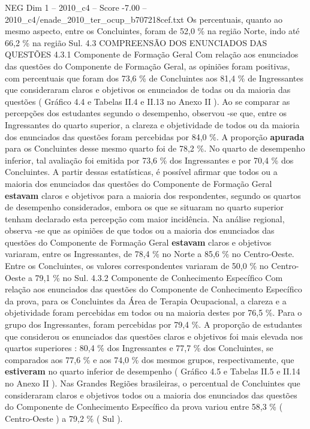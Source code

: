 \begin{textsample}{NEG Dim 1 – 2010\_c4 – Score -7.00 – 2010\_c4/enade\_2010\_ter\_ocup\_b707218cef.txt}
Os percentuais, quanto ao mesmo aspecto, entre os Concluintes, foram de 52,0 \% na região Norte, indo até 66,2 \% na região Sul. 4.3 COMPREENSÃO DOS ENUNCIADOS DAS QUESTÕES 4.3.1 Componente de Formação Geral Com relação aos enunciados das questões do Componente de Formação Geral, as opiniões foram positivas, com percentuais que foram dos 73,6 \% de Concluintes aos 81,4 \% de Ingressantes que consideraram claros e objetivos os enunciados de todas ou da maioria das questões ( Gráfico 4.4 e Tabelas II.4 e II.13 no Anexo II ).
Ao se comparar as percepções dos estudantes segundo o desempenho, observou -se que, entre os Ingressantes do quarto superior, a clareza e objetividade de todos ou da maioria dos enunciados das questões foram percebidas por 84,0 \%.
A proporção \textbf{apurada} para os Concluintes desse mesmo quarto foi de 78,2 \%.
No quarto de desempenho inferior, tal avaliação foi emitida por 73,6 \% dos Ingressantes e por 70,4 \% dos Concluintes.
A partir dessas estatísticas, é possível afirmar que todos ou a maioria dos enunciados das questões do Componente de Formação Geral \textbf{estavam} claros e objetivos para a maioria dos respondentes, segundo os quartos de desempenho considerados, embora os que se situaram no quarto superior tenham declarado esta percepção com maior incidência.
Na análise regional, observa -se que as opiniões de que todos ou a maioria dos enunciados das questões do Componente de Formação Geral \textbf{estavam} claros e objetivos variaram, entre os Ingressantes, de 78,4 \% no Norte a 85,6 \% no Centro-Oeste.
Entre os Concluintes, os valores correspondentes variaram de 50,0 \% no Centro-Oeste a 79,1 \% no Sul. 4.3.2 Componente de Conhecimento Específico Com relação aos enunciados das questões do Componente de Conhecimento Específico da prova, para os Concluintes da Área de Terapia Ocupacional, a clareza e a objetividade foram percebidas em todos ou na maioria destes por 76,5 \%.
Para o grupo dos Ingressantes, foram percebidas por 79,4 \%.
A proporção de estudantes que considerou os enunciados das questões claros e objetivos foi mais elevada nos quartos superiores : 80,4 \% dos Ingressantes e 77,7 \% dos Concluintes, se comparados aos 77,6 \% e aos 74,0 \% dos mesmos grupos, respectivamente, que \textbf{estiveram} no quarto inferior de desempenho ( Gráfico 4.5 e Tabelas II.5 e II.14 no Anexo II ).
Nas Grandes Regiões brasileiras, o percentual de Concluintes que consideraram claros e objetivos todos ou a maioria dos enunciados das questões do Componente de Conhecimento Específico da prova variou entre 58,3 \% ( Centro-Oeste ) a 79,2 \% ( Sul ).

\end{textsample}
